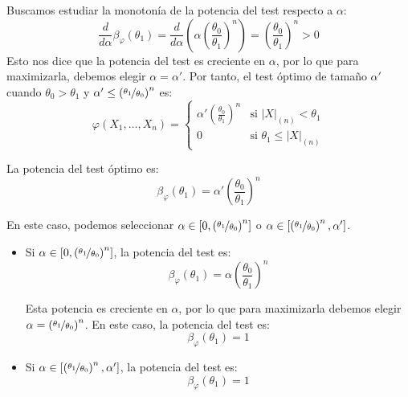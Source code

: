 \begin{ejercicio}
\begin{description}
\begin{description}
            Buscamos estudiar la monotonía de la potencia del test respecto a $\alpha$:
            \begin{equation*}
                \frac{d}{d\alpha}\beta_\varphi(\theta_1) = \frac{d}{d\alpha}\left(\alpha\left(\frac{\theta_0}{\theta_1}\right)^n\right) = \left(\frac{\theta_0}{\theta_1}\right)^n > 0
            \end{equation*}
            Esto nos dice que la potencia del test es creciente en $\alpha$, por lo que para maximizarla, debemos elegir $\alpha = \alpha'$. Por tanto, el test óptimo de tamaño $\alpha'$ cuando $\theta_0 > \theta_1$ y $\alpha'\leq \left(\nicefrac{\theta_1}{\theta_0}\right)^n$ es:
            \begin{equation*}
                \varphi(X_1, \ldots, X_n) = \left\{\begin{array}{ll}
                    \alpha'\left(\frac{\theta_0}{\theta_1}\right)^n & \text{si\ } |X|_{(n)} < \theta_1 \\
                    0 & \text{si\ } \theta_1 \leq |X|_{(n)}
                \end{array}\right.
            \end{equation*}

            La potencia del test óptimo es:
            \begin{equation*}
                \beta_\varphi(\theta_1) = \alpha'\left(\frac{\theta_0}{\theta_1}\right)^n
            \end{equation*}

            \item[Subcaso $\alpha' > \left(\nicefrac{\theta_1}{\theta_0}\right)^n$.] En este caso, podemos seleccionar $\alpha\in \left[0,\left(\nicefrac{\theta_1}{\theta_0}\right)^n\right]$ o $\alpha\in \left[\left(\nicefrac{\theta_1}{\theta_0}\right)^n,\alpha'\right]$.
            \begin{itemize}
                \item Si $\alpha\in \left[0,\left(\nicefrac{\theta_1}{\theta_0}\right)^n\right]$, la potencia del test es:
                \begin{equation*}
                    \beta_\varphi(\theta_1) = \alpha\left(\frac{\theta_0}{\theta_1}\right)^n
                \end{equation*}

                Esta potencia es creciente en $\alpha$, por lo que para maximizarla debemos elegir $\alpha = \left(\nicefrac{\theta_1}{\theta_0}\right)^n$. En este caso, la potencia del test es:
                \begin{equation*}
                    \beta_\varphi(\theta_1) = 1
                \end{equation*}
                \item Si $\alpha\in \left[\left(\nicefrac{\theta_1}{\theta_0}\right)^n,\alpha'\right]$, la potencia del test es:
                \begin{equation*}
                    \beta_\varphi(\theta_1) = 1
                \end{equation*}


\end{itemize}
\end{description}
\end{description}
\end{ejercicio}
